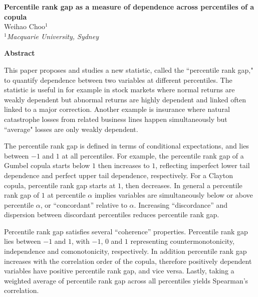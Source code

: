
\setlength{\parindent}{0ex}
\setlength{\parskip}{2.5ex}
\setlength{\textwidth}{14.8cm}
\pagestyle{empty}


\begin{center}
{\large\bf Percentile rank gap as a measure of dependence across percentiles of a copula}\\

\vspace{0.5cm}
Weihao Choo$^1$\\

\vspace{0.5cm}
{\it  $^1$Macquarie University, Sydney}
\end{center}

\hrulefill

{\bf Abstract}

This paper proposes and studies a new statistic, called the ``percentile rank gap," to quantify  dependence between  two variables at different 
percentiles.  The statistic is useful in for example in stock markets where normal returns are weakly dependent
 but abnormal returns are highly dependent and linked often linked to a major correction. Another example is insurance where natural 
catastrophe losses from related business lines happen simultaneously but ``average" losses are  only weakly dependent.

The percentile rank gap is defined in terms of conditional expectations, and lies between $-1$ and $1$ at all percentiles.
For example, the percentile rank gap of a Gumbel copula starts below $1$ then increases to $1$,
reflecting imperfect lower tail dependence and perfect upper tail dependence, respectively.
For a Clayton copula, percentile rank gap starts at $1$, then decreases.
In general a percentile rank gap of $1$ at percentile $\alpha$ implies variables are simultaneously below or above percentile $\alpha$, or 
``concordant'' relative to $\alpha$.
Increasing ``discordance'' and dispersion between discordant percentiles reduces percentile rank gap.

Percentile rank gap satisfies several ``coherence'' properties.
Percentile rank gap lies between $-1$ and $1$, with $-1$, $0$ and $1$ representing countermonotonicity,
independence and comonotonicity, respectively.
In addition percentile rank gap increases with the correlation order of the copula,
 therefore positively dependent variables have positive percentile rank gap, and vice versa.
 Lastly, taking a weighted average of percentile rank gap across all percentiles yields Spearman's correlation.

